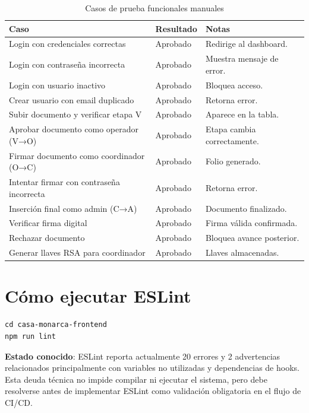 \documentclass[10pt,letterpaper]{report}
\begin{document}
\begin{table}[H]
\centering
\caption{Casos de prueba funcionales manuales}
\label{tab:pruebas}
\begin{tabular}{p{} p{} p{}}
\toprule
\textbf{Caso} & \textbf{Resultado} & \textbf{Notas} \\
\midrule
Login con credenciales correctas & Aprobado & Redirige al dashboard. \\
Login con contraseña incorrecta & Aprobado & Muestra mensaje de error. \\
Login con usuario inactivo & Aprobado & Bloquea acceso. \\
Crear usuario con email duplicado & Aprobado & Retorna error. \\
Subir documento y verificar etapa V & Aprobado & Aparece en la tabla. \\
Aprobar documento como operador (V→O) & Aprobado & Etapa cambia correctamente. \\
Firmar documento como coordinador (O→C) & Aprobado & Folio generado. \\
Intentar firmar con contraseña incorrecta & Aprobado & Retorna error. \\
Inserción final como admin (C→A) & Aprobado & Documento finalizado. \\
Verificar firma digital & Aprobado & Firma válida confirmada. \\
Rechazar documento & Aprobado & Bloquea avance posterior. \\
Generar llaves RSA para coordinador & Aprobado & Llaves almacenadas. \\
\bottomrule
\end{tabular}
\end{table}

\section{Cómo ejecutar ESLint}

\begin{lstlisting}[style=bashstyle]
cd casa-monarca-frontend
npm run lint
\end{lstlisting}

\textbf{Estado conocido}: ESLint reporta actualmente 20 errores y 2 advertencias relacionados principalmente con variables no utilizadas y dependencias de hooks. Esta deuda técnica no impide compilar ni ejecutar el sistema, pero debe resolverse antes de implementar ESLint como validación obligatoria en el flujo de CI/CD.
\end{document}
